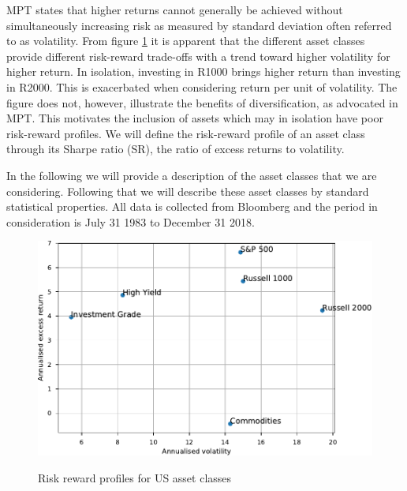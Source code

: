\documentclass[11pt,a4paper,oneside]{article}
\begin{document}
MPT states that higher returns cannot generally be achieved without simultaneously increasing risk as measured by standard deviation often referred to as volatility. From figure \ref{riskreward} it is apparent that the different asset classes provide different risk-reward trade-offs with a trend toward higher volatility for higher return. In isolation, investing in R1000 brings higher return than investing in R2000. This is exacerbated when considering return per unit of volatility. The figure does not, however, illustrate the benefits of diversification, as advocated in MPT. This motivates the inclusion of assets which may in isolation have poor risk-reward profiles. We will define the risk-reward profile of an asset class through its Sharpe ratio (SR), the ratio of excess returns to volatility. 

In the following we will provide a description of the asset classes that we are considering. Following that we will describe these asset classes by standard statistical properties. All data is collected from Bloomberg and the period in consideration is July 31 1983 to December 31 2018.    


\begin{figure}[ht]
\centering
\vspace{4mm}
\caption{Risk reward profiles for US asset classes}
\label{riskreward}
\includegraphics[scale=1]{images/Sharpes.pdf}
\begingroup
\vspace{4mm}
\endgroup
\end{figure}
\end{document}
